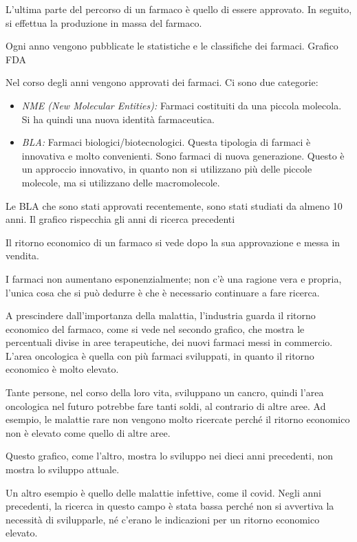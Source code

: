 L'ultima parte del percorso di un farmaco è quello di essere approvato.
In seguito, si effettua la produzione in massa del farmaco.

Ogni anno vengono pubblicate le statistiche e le classifiche dei
farmaci. Grafico FDA

Nel corso degli anni vengono approvati dei farmaci. Ci sono due
categorie:
\begin{itemize}
\item \emph{NME (New Molecular Entities):} Farmaci costituiti da una
piccola molecola. Si ha quindi una nuova identità farmaceutica.
\item \emph{BLA:} Farmaci biologici/biotecnologici. Questa tipologia di farmaci è
innovativa e molto convenienti. Sono farmaci di nuova generazione.
Questo è un approccio innovativo, in quanto non si utilizzano più delle
piccole molecole, ma si utilizzano delle macromolecole.
\end{itemize}

Le BLA che sono stati approvati recentemente, sono stati studiati da
almeno 10 anni. Il grafico rispecchia gli anni di ricerca precedenti

Il ritorno economico di un farmaco si vede dopo la sua approvazione e
messa in vendita.

I farmaci non aumentano esponenzialmente; non c'è una ragione vera e
propria, l'unica cosa che si può dedurre è che è necessario continuare a
fare ricerca.


A prescindere dall'importanza della malattia, l'industria guarda il
ritorno economico del farmaco, come si vede nel secondo grafico, che
mostra le percentuali divise in aree terapeutiche, dei nuovi farmaci
messi in commercio. L'area oncologica è quella con più farmaci
sviluppati, in quanto il ritorno economico è molto elevato.

Tante persone, nel corso della loro vita, sviluppano un cancro, quindi
l'area oncologica nel futuro potrebbe fare tanti soldi, al contrario di
altre aree. Ad esempio, le malattie rare non vengono molto ricercate
perché il ritorno economico non è elevato come quello di altre aree.

Questo grafico, come l'altro, mostra lo sviluppo nei dieci anni
precedenti, non mostra lo sviluppo attuale.

Un altro esempio è quello delle malattie infettive, come il covid. Negli
anni precedenti, la ricerca in questo campo è stata bassa perché non si
avvertiva la necessità di svilupparle, né c'erano le indicazioni per un
ritorno economico elevato.

